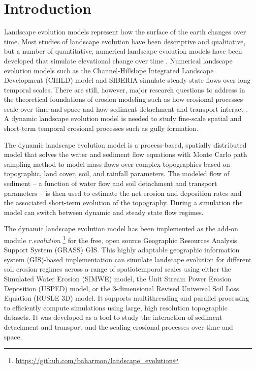 \documentclass[final,3p,times,twocolumn]{elsarticle}
\begin{document}
\tableofcontents
\vfil
\pagebreak


\section{Introduction}

Landscape evolution models represent how the surface of the earth changes over time. 
Most studies of landscape evolution have been descriptive and qualitative, 
but a number of quantitative, numerical landscape evolution models 
have been developed 
that simulate elevational change over time 
\cite{Temme2013}. 
Numerical landscape evolution models
such as the Channel-Hillslope Integrated Landscape Development (CHILD) model 
\cite{Tucker2001} 
and SIBERIA \cite{Willgoose2005} 
simulate steady state flows over long temporal scales. 
There are still, however, major research questions 
to address in the theoretical foundations of erosion modeling 
such as how erosional processes scale over time and space 
and how sediment detachment and transport interact \cite{Mitasova2013}. 
A dynamic landscape evolution model is needed to study 
fine-scale spatial and short-term temporal erosional processes
such as gully formation. %


The dynamic landscape evolution model
is a process-based, spatially distributed model
that solves the water and sediment flow equations 
with Monte Carlo path sampling method
\cite{Mitasova2004}
to model mass flows over complex topographies 
based on topographic, land cover, soil, and rainfall parameters.
The modeled flow of sediment -- 
a function of water flow and soil detachment and transport parameters -- 
is then used to estimate the net erosion and deposition rates 
and the associated short-term evolution of the topography. 
During a simulation the model can switch between 
dynamic and steady state flow regimes. 

The dynamic landscape evolution model
has been implemented as the add-on module 
\textit{r.evolution}
\footnote{\url{https://github.com/baharmon/landscape\_evolution}} 
for the free, open source
Geographic Resources Analysis Support System (GRASS) GIS.
%
This highly adaptable
geographic information system (GIS)-based implementation
can simulate landscape evolution 
for different soil erosion regimes
across a range of spatiotemporal scales
using either
the Simulated Water Erosion (SIMWE) model, 
the Unit Stream Power Erosion Deposition (USPED) model,
or the 3-dimensional Revised Universal Soil Loss Equation (RUSLE 3D) model.  
%
It supports multithreading and parallel processing
to efficiently compute simulations 
using large, high resolution topographic datasets.
%
It was developed as a tool to study 
the interaction of sediment detachment and transport
and the scaling erosional processes over time and space. 
\end{document}
